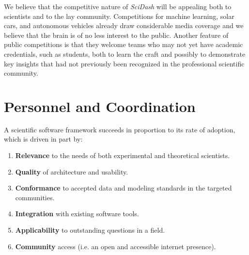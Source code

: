 \documentclass[11pt,letterpaper]{article}
\begin{document}
We believe that the competitive nature of \textit{SciDash} will be appealing both to scientists and to the lay community.  Competitions for machine learning, solar cars, and autonomous vehicles already draw considerable media coverage and we believe that the brain is of no less interest to the public.  Another feature of public competitions is that they welcome teams who may not yet have academic credentials, such as students, both to learn the craft and possibly to demonstrate key insights that had not previously been recognized in the professional scientific community.  

\section{Personnel and Coordination}
\renewcommand{\theenumi}{\alph{enumi}}
A scientific software framework succeeds in proportion to its rate of adoption, which is driven in part by:
\begin{enumerate}
\item \textbf{Relevance} to the needs of both experimental and theoretical scientists.
\item \textbf{Quality} of architecture and usability.
\item \textbf{Conformance} to accepted data and modeling standards in the targeted communities.
\item \textbf{Integration} with existing software tools.  
\item \textbf{Applicability} to outstanding questions in a field.
\item \textbf{Community} access (i.e. an open and accessible internet presence).  
\end{enumerate}
\end{document}
